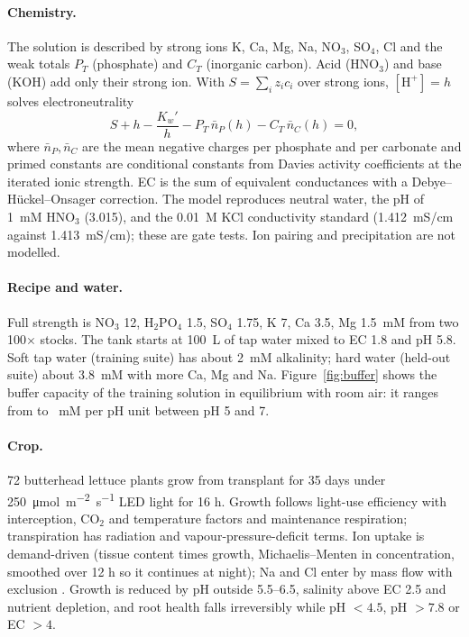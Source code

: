 \documentclass[11pt]{article}
\begin{document}
\paragraph{Chemistry.} The solution is described by strong ions K, Ca, Mg, Na, NO$_3$, SO$_4$, Cl and the weak totals $P_T$ (phosphate) and $C_T$ (inorganic carbon). Acid (HNO$_3$) and base (KOH) add only their strong ion. With $S = \sum_i z_i c_i$ over strong ions, $[\mathrm{H}^+] = h$ solves electroneutrality
\begin{equation}
S + h - \frac{K_w'}{h} - P_T\,\bar n_P(h) - C_T\,\bar n_C(h) = 0,
\end{equation}
where $\bar n_P, \bar n_C$ are the mean negative charges per phosphate and per carbonate and primed constants are conditional constants from Davies activity coefficients \citep{davies1962ion,stumm1996aquatic} at the iterated ionic strength. EC is the sum of equivalent conductances with a Debye--H\"uckel--Onsager correction. The model reproduces neutral water, the pH of \SI{1}{mM} HNO$_3$ (3.015), and the \SI{0.01}{M} KCl conductivity standard (\SI{1.412}{mS/cm} against \SI{1.413}{mS/cm}); these are gate tests. Ion pairing and precipitation are not modelled.

\paragraph{Recipe and water.} Full strength is NO$_3$ 12, H$_2$PO$_4$ 1.5, SO$_4$ 1.75, K 7, Ca 3.5, Mg \SI{1.5}{mM} from two \num{100}$\times$ stocks. The tank starts at \SI{100}{L} of tap water mixed to EC 1.8 and pH 5.8. Soft tap water (training suite) has about \SI{2}{mM} alkalinity; hard water (held-out suite) about \SI{3.8}{mM} with more Ca, Mg and Na. Figure~\ref{fig:buffer} shows the buffer capacity of the training solution in equilibrium with room air: it ranges from \nBetaMin{} to \nBetaMax{}~mM per pH unit between pH 5 and 7.

\paragraph{Crop.} 72 butterhead lettuce plants grow from transplant for 35 days under \SI{250}{\micro mol.m^{-2}.s^{-1}} LED light for 16 h. Growth follows light-use efficiency with interception, CO$_2$ and temperature factors and maintenance respiration; transpiration has radiation and vapour-pressure-deficit terms. Ion uptake is demand-driven (tissue content times growth, Michaelis--Menten in concentration, smoothed over 12 h so it continues at night); Na and Cl enter by mass flow with exclusion \citep{lopezmora2024uptake}. Growth is reduced by pH outside 5.5--6.5, salinity above EC 2.5 and nutrient depletion, and root health falls irreversibly while pH $<4.5$, pH $>7.8$ or EC $>4$.
\end{document}
